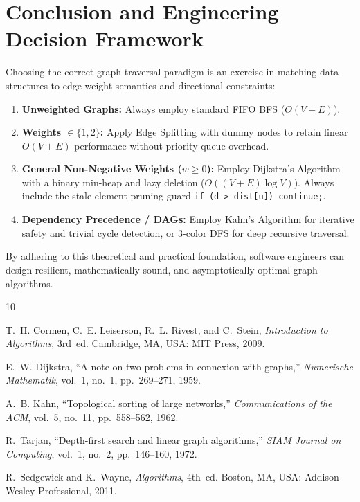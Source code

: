 \documentclass[10pt,journal,compsoc,onecolumn]{IEEEtran}
\begin{document}
\section{Conclusion and Engineering Decision Framework}
\label{sec:conclusion}

Choosing the correct graph traversal paradigm is an exercise in matching data structures to edge weight semantics and directional constraints:
\begin{enumerate}
    \item \textbf{Unweighted Graphs:} Always employ standard FIFO BFS ($O(V + E)$).
    \item \textbf{Weights $\in \{1, 2\}$:} Apply Edge Splitting with dummy nodes to retain linear $O(V + E)$ performance without priority queue overhead.
    \item \textbf{General Non-Negative Weights ($w \ge 0$):} Employ Dijkstra's Algorithm with a binary min-heap and lazy deletion ($O((V+E)\log V)$). Always include the stale-element pruning guard \texttt{if (d > dist[u]) continue;}.
    \item \textbf{Dependency Precedence / DAGs:} Employ Kahn's Algorithm for iterative safety and trivial cycle detection, or 3-color DFS for deep recursive traversal.
\end{enumerate}

By adhering to this theoretical and practical foundation, software engineers can design resilient, mathematically sound, and asymptotically optimal graph algorithms.

\begin{thebibliography}{10}

T.~H. Cormen, C.~E. Leiserson, R.~L. Rivest, and C.~Stein,
\emph{Introduction to Algorithms}, 3rd~ed.
Cambridge, MA, USA: MIT Press, 2009.

E.~W. Dijkstra,
``A note on two problems in connexion with graphs,''
\emph{Numerische Mathematik}, vol.~1, no.~1, pp.~269--271, 1959.

A.~B. Kahn,
``Topological sorting of large networks,''
\emph{Communications of the ACM}, vol.~5, no.~11, pp.~558--562, 1962.

R.~Tarjan,
``Depth-first search and linear graph algorithms,''
\emph{SIAM Journal on Computing}, vol.~1, no.~2, pp.~146--160, 1972.

R.~Sedgewick and K.~Wayne,
\emph{Algorithms}, 4th~ed.
Boston, MA, USA: Addison-Wesley Professional, 2011.

\end{thebibliography}
\end{document}
